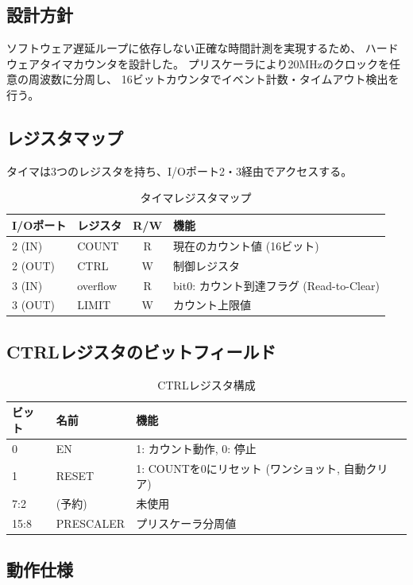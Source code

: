 \documentclass[a4paper,11pt]{ltjsarticle}
\begin{document}
\subsection{設計方針}

ソフトウェア遅延ループに依存しない正確な時間計測を実現するため、
ハードウェアタイマカウンタを設計した。
プリスケーラにより20MHzのクロックを任意の周波数に分周し、
16ビットカウンタでイベント計数・タイムアウト検出を行う。

\subsection{レジスタマップ}

タイマは3つのレジスタを持ち、I/Oポート2・3経由でアクセスする。

\begin{table}[h]
\centering
\caption{タイマレジスタマップ}
\begin{tabular}{llcl}
\toprule
I/Oポート & レジスタ & R/W & 機能 \\
\midrule
2 (IN)  & COUNT & R   & 現在のカウント値 (16ビット) \\
2 (OUT) & CTRL  & W   & 制御レジスタ \\
3 (IN)  & overflow & R & bit0: カウント到達フラグ (Read-to-Clear) \\
3 (OUT) & LIMIT & W   & カウント上限値 \\
\bottomrule
\end{tabular}
\end{table}

\subsection{CTRLレジスタのビットフィールド}

\begin{table}[h]
\centering
\caption{CTRLレジスタ構成}
\begin{tabular}{lll}
\toprule
ビット & 名前 & 機能 \\
\midrule
0     & EN        & 1: カウント動作, 0: 停止 \\
1     & RESET     & 1: COUNTを0にリセット (ワンショット, 自動クリア) \\
7:2   & (予約)    & 未使用 \\
15:8  & PRESCALER & プリスケーラ分周値 \\
\bottomrule
\end{tabular}
\end{table}

\subsection{動作仕様}
\end{document}
